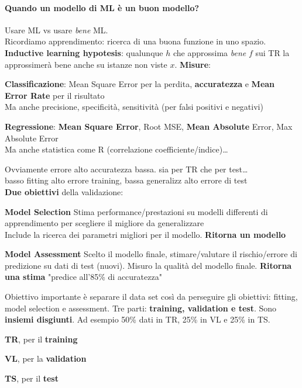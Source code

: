 \documentclass[10pt]{book}
\begin{document}
\paragraph{Quando un modello di ML è un buon modello?} Usare ML vs usare \textit{bene} ML.\\
Ricordiamo apprendimento: ricerca di una buona funzione in uno spazio.\\
\textbf{Inductive learning hypotesis}: qualunque $h$ che approssima \textit{bene} $f$ sui TR la approssimerà bene anche su istanze non viste $x$. \textbf{Misure}:
\begin{list}{}{}
	\item \textbf{Classificazione}: Mean Square Error per la perdita, \textbf{accuratezza} e \textbf{Mean Error Rate} per il risultato\\
	Ma anche precisione, specificità, sensitività (per falsi positivi e negativi)
	\item \textbf{Regressione}: \textbf{Mean Square Error}, Root MSE, \textbf{Mean Absolute }Error, Max Absolute Error\\Ma anche statistica come R (correlazione coefficiente/indice)\ldots
\end{list}
Ovviamente errore alto accuratezza bassa. sia per TR che per test\ldots\\basso fitting alto errore training, bassa generalizz alto errore di test\\
\textbf{Due obiettivi} della validazione:
\begin{list}{}{}
	\item  \textbf{Model Selection} Stima performance/prestazioni su modelli differenti di apprendimento per scegliere il migliore da generalizzare\\
	Include la ricerca dei parametri migliori per il modello. \textbf{Ritorna un modello}
	\item \textbf{Model Assessment} Scelto il modello finale, stimare/valutare il rischio/errore di predizione su dati di test (nuovi). Misuro la qualità del modello finale. \textbf{Ritorna una stima} "predice all'85\% di accuratezza"
\end{list}
Obiettivo importante è separare il data set così da perseguire gli obiettivi: fitting, model selection e assessment. Tre parti: \textbf{training, validation e test}. Sono \textbf{insiemi disgiunti}. Ad esempio 50\% dati in TR, 25\% in VL e 25\% in TS.
\begin{list}{}{}
	\item \textbf{TR}, per il \textbf{training}
	\item \textbf{VL}, per la \textbf{validation}
	\item \textbf{TS}, per il \textbf{test}
\end{list}
\end{document}
